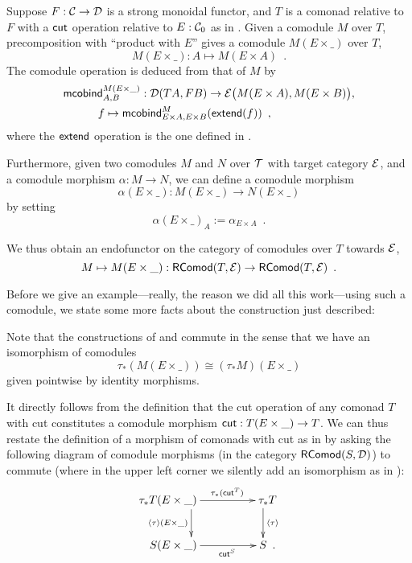 \documentclass[conference,10pt]{IEEEtran}
\begin{document}
\begin{definition}\label{def:product_in_context}
 Suppose $F:{\mathcal{C}}\to\mathcal{D}$ is a strong monoidal functor, and $T$ is a comonad relative to $F$ with a $\mathsf{cut}$ operation 
 relative to $E:{\mathcal{C}}_0$ as in .
 Given a comodule $M$ over $T$,  precomposition with \enquote{product with $E$}
 gives a comodule $M(E\times\_)$ over $T$,
  \[    M(E\times \_) : A \mapsto M(E\times A) \enspace . \]
 The comodule operation is deduced from that of $M$ by 
 \begin{align*} \mathsf{mcobind}^{M(E\times\_)}_{A,B} : \mathcal{D}(TA,FB)&\to \mathcal{E}\bigl(M(E\times A), M(E\times B)\bigr) ,\\
                                                      f \mapsto \mathsf{mcobind}^M_{E\times A,E\times B}&(\mathsf{extend}(f)) \enspace ,
  \end{align*}                                        
where the $\mathsf{extend}$ operation is the one defined in .
 
 Furthermore, given two comodules $M$ and $N$ over $\mathcal{T}$ with target category $\mathcal{E}$, and a comodule morphism $\alpha : M \to N$,  
 we can define a comodule morphism \[\alpha(E\times \_) : M(E\times \_) \to N(E\times \_) \] by setting
          \[ \alpha(E \times \_)_A := \alpha_{E\times A} \enspace . \]
  
  \noindent
  We thus obtain an endofunctor on the category of comodules over $T$ towards $\mathcal{E}$,
   \[ M \mapsto  M (E\times \_) : \mathsf{RComod}(T,\mathcal{E}) \to \mathsf{RComod}(T,\mathcal{E}) \enspace . \]
\end{definition}


Before we give an example---really, the reason we did all this work---using such a comodule, we state some more facts about 
the construction just described:

\begin{remark}\label{rem:prod_pullback_commute}
 Note that the constructions of  and  commute in the sense that
 we have an isomorphism of comodules \[\tau_*(M(E\times \_)) \cong (\tau_*M)(E \times \_)  \]
 given pointwise by identity morphisms.
\end{remark}



It directly follows from the definition that the cut operation of any comonad $T$ with cut 
constitutes a comodule morphism $\mathsf{cut} : T(E\times \_) \to T$.
We can thus restate the definition of a morphism of comonads with cut as in  by asking the following diagram 
of comodule morphisms (in the category $\mathsf{RComod}(S,\mathcal{D})$) to commute
(where in the upper left corner we silently add an isomorphism as in ):
 \[ \begin{xy}
       \xymatrix{  **[l] \tau_*T(E\times \_ )  \ar[r]^{\tau_*(\cut^T)} \ar[d]_{\induced{\tau}(E\times \_)}  &  **[r] \tau_*T \ar[d]^{\induced{\tau}} \\
                   **[l]  S (E\times \_ ) \ar[r]_{\cut^S}  &  **[r] S  \enspace .
        }
      \end{xy}
   \]
\end{document}
